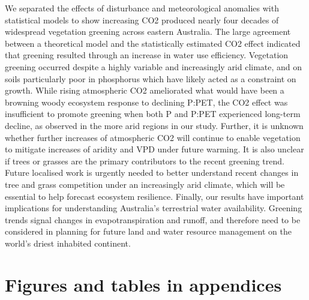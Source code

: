\documentclass[gc, manuscript]{copernicus}
\begin{document}
\conclusions[Conclusions]We separated the effects of disturbance and
meteorological anomalies with statistical models to show increasing CO2
produced nearly four decades of widespread vegetation greening across
eastern Australia. The large agreement between a theoretical model and
the statistically estimated CO2 effect indicated that greening resulted
through an increase in water use efficiency. Vegetation greening
occurred despite a highly variable and increasingly arid climate, and on
soils particularly poor in phosphorus which have likely acted as a
constraint on growth. While rising atmospheric CO2 ameliorated what
would have been a browning woody ecosystem response to declining P:PET,
the CO2 effect was insufficient to promote greening when both P and
P:PET experienced long-term decline, as observed in the more arid
regions in our study. Further, it is unknown whether further increases
of atmospheric CO2 will continue to enable vegetation to mitigate
increases of aridity and VPD under future warming. It is also unclear if
trees or grasses are the primary contributors to the recent greening
trend. Future localised work is urgently needed to better understand
recent changes in tree and grass competition under an increasingly arid
climate, which will be essential to help forecast ecosystem resilience.
Finally, our results have important implications for understanding
Australia's terrestrial water availability. Greening trends signal
changes in evapotranspiration and runoff, and therefore need to be
considered in planning for future land and water resource management on
the world's driest inhabited continent.







\appendix
\section{Figures and tables in appendices}
\end{document}
